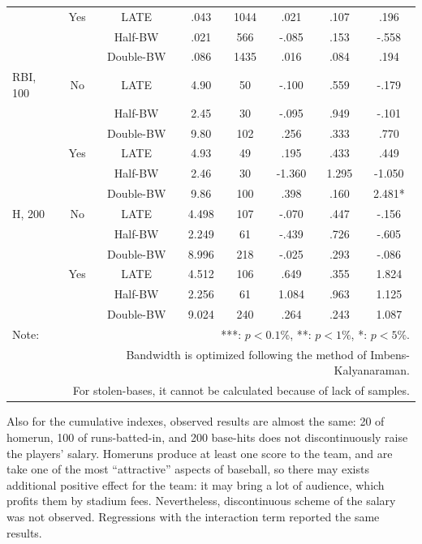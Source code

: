 \documentclass[dvipdfmx, 12pt]{article}
\begin{document}
\begin{table}[H]
\begin{tabular}{@{\extracolsep{0pt}}lccccccc}
    & Yes & LATE & .043 & 1044 & .021 & .107 & .196 \\
    & & Half-BW & .021 & 566 & -.085 & .153 & -.558 \\
    & &Double-BW & .086 & 1435 & .016 & .084 & .194 \\ \hline

    RBI, 100 & No & LATE & 4.90 & 50 & -.100 & .559 & -.179 \\
    & &Half-BW & 2.45 & 30 & -.095 & .949 & -.101 \\
    & &Double-BW & 9.80 & 102 & .256 & .333 & .770 \\ \cline{3-8}

    & Yes & LATE & 4.93 & 49 & .195 & .433 & .449 \\
    & & Half-BW & 2.46 & 30 & -1.360 & 1.295 & -1.050 \\
    & & Double-BW & 9.86 & 100 & .398 & .160 & 2.481* \\ \hline

    H, 200& No & LATE & 4.498 & 107 & -.070 & .447 & -.156 \\
    & & Half-BW & 2.249 & 61 & -.439 & .726 & -.605 \\
    & & Double-BW & 8.996 & 218 & -.025 & .293 & -.086 \\ \cline{3-8}

    & Yes & LATE & 4.512 & 106 & .649 & .355 & 1.824 \\
    & & Half-BW & 2.256 & 61 & 1.084 & .963 & 1.125 \\
    & & Double-BW & 9.024 & 240 & .264 & .243 & 1.087 \\ \hline

    Note: & \multicolumn{7}{r}{***: $p<0.1\%$, **: $p<1\%$, *: $p<5\%$.} \\
    & \multicolumn{7}{r}{Bandwidth is optimized following the method of Imbens-Kalyanaraman.}　\\
    & \multicolumn{7}{r}{
    For stolen-bases, it cannot be calculated because of lack of samples.
    }
  \end{tabular}
\end{table}

Also for the cumulative indexes, observed results are almost the same: 20 of homerun, 100 of runs-batted-in, and 200 base-hits does not discontinuously raise the players' salary. Homeruns produce at least one score to the team, and are take one of the most ``attractive'' aspects of baseball, so there may exists additional positive effect for the team: it may bring a lot of audience, which profits them by stadium fees. Nevertheless, discontinuous scheme of the salary was not observed. Regressions with the interaction term reported the same results.
\end{document}

